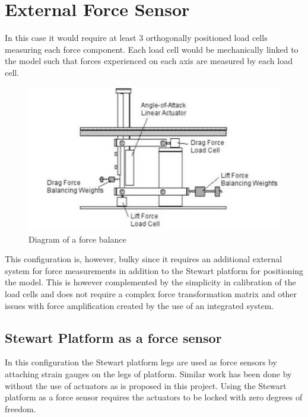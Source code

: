 \section{External Force Sensor}
In this case it would require at least 3 orthogonally positioned load cells measuring each force component. Each load cell would be mechanically linked to the model such that forces experienced on each axis are measured by each load cell. 
\begin{center}
	\begin{figure}[H]
		\centering
		\includegraphics{Figures/modBal}
		\caption[Diagram of a force balance]{Diagram of a force balance \cite{post_force_2010}}
	\end{figure}
\end{center}
This configuration is, however, bulky since it requires an additional external system for force measurements in addition to the Stewart platform for positioning the model. This is however complemented by the simplicity in calibration of the load cells and does not require a complex force transformation matrix and other issues with force amplification created by the use of an integrated system.
\subsection{Stewart Platform as a force sensor}
In this configuration the Stewart platform legs are used as force sensors by attaching strain gauges on the legs of platform. Similar work has been done by \cite{ferreira2015design} without the use of actuators as is proposed in this project. Using the Stewart platform as a force sensor requires the actuators to be locked with zero degrees of freedom.

